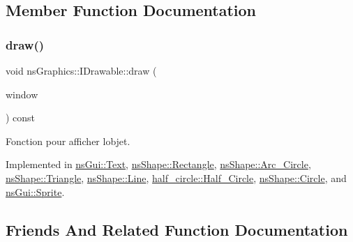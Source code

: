 \subsection{Member Function Documentation}
\mbox{\label{classns_graphics_1_1_i_drawable_abed8a61e1d507d31e76f0891f3bf9c51}} 
\subsubsection{\texorpdfstring{draw()}{draw()}}
{\footnotesize\ttfamily void ns\+Graphics\+::\+I\+Drawable\+::draw (\begin{DoxyParamCaption}\item[{\hyperlink{class_min_g_l}{Min\+GL} \&}]{window }\end{DoxyParamCaption}) const\hspace{0.3cm}{\ttfamily [pure virtual]}}



Fonction pour afficher l\textquotesingle{}objet. 



Implemented in \hyperlink{classns_gui_1_1_text_ac353893e3b7cce7585c619acbc0e255b}{ns\+Gui\+::\+Text}, \hyperlink{classns_shape_1_1_rectangle_acbe8ed9e23b67090e7638563f2593735}{ns\+Shape\+::\+Rectangle}, \hyperlink{classns_shape_1_1_arc___circle_a1e789ca962aeefd7dfd861eb0f75a6d7}{ns\+Shape\+::\+Arc\+\_\+\+Circle}, \hyperlink{classns_shape_1_1_triangle_a4b3867fb0e15995b2a6c261d9b0d968d}{ns\+Shape\+::\+Triangle}, \hyperlink{classns_shape_1_1_line_ae14d0de306fa91ee38bafd1d27682beb}{ns\+Shape\+::\+Line}, \hyperlink{classhalf__circle_1_1_half___circle_a46b2ea1d78fcacdf2b79707c6431774b}{half\+\_\+circle\+::\+Half\+\_\+\+Circle}, \hyperlink{classns_shape_1_1_circle_a279581f6104719395091039cea1707e5}{ns\+Shape\+::\+Circle}, and \hyperlink{classns_gui_1_1_sprite_a15157c69a1d792080d2b41519659418c}{ns\+Gui\+::\+Sprite}.



\subsection{Friends And Related Function Documentation}
\mbox{\label{classns_graphics_1_1_i_drawable_a9bb3952d4e675a663f2dbbda11e79395}} 
